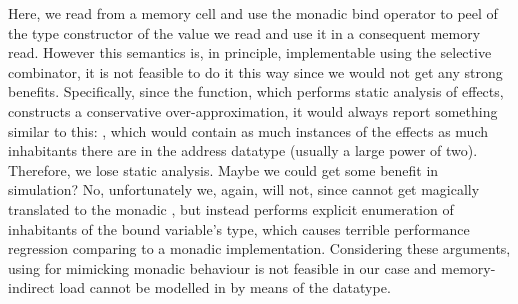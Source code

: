 Here, we read from a memory cell and use the monadic bind operator to
peel of the  type constructor of the value we read and use it in a consequent
memory read. However this semantics is, in principle, implementable using the
selective  combinator, it is not feasible to do it this way since we would
not get any strong benefits. Specifically, since the  function, which
performs static analysis of effects, constructs a conservative over-approximation, it
would always report something similar to this: \hs{[Read addr,Write reg, Write reg...},
which would contain as much instances of the  effects as much inhabitants there
are in the address datatype (usually a large power of two). Therefore, we lose static analysis.
Maybe we could get some benefit in simulation? No, unfortunately we, again, will not, since
 cannot get magically translated to the monadic \hs{>>=}, but instead performs
explicit enumeration of inhabitants of the bound variable's type, which causes terrible performance regression comparing to a monadic implementation. Considering these arguments,
using  for mimicking monadic behaviour is not feasible in our case and memory-indirect
load cannot be modelled in by means of the  datatype.